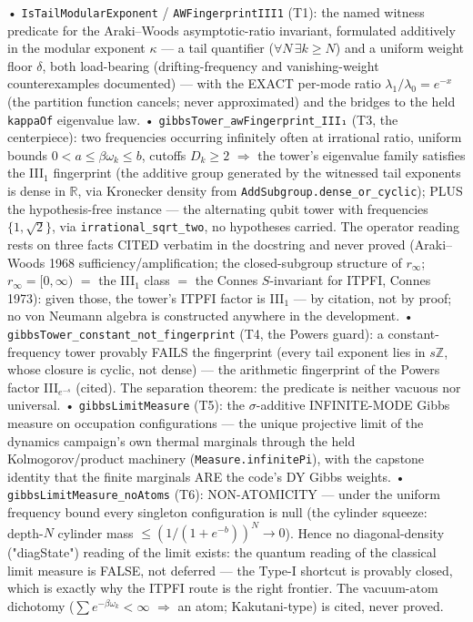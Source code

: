 \documentclass[11pt,a4paper]{article}
\begin{document}
  • \texttt{IsTailModularExponent} / \texttt{AWFingerprintIII1} (T1): the named witness predicate for the Araki--Woods asymptotic-ratio invariant, formulated additively in the modular exponent $\kappa$ --- a tail quantifier ($\forall N\,\exists k\ge N$) and a uniform weight floor $\delta$, both load-bearing (drifting-frequency and vanishing-weight counterexamples documented) --- with the EXACT per-mode ratio $\lambda_1/\lambda_0 = e^{-x}$ (the partition function cancels; never approximated) and the bridges to the held \texttt{kappaOf} eigenvalue law.
  • \texttt{gibbsTower\_awFingerprint\_III₁} (T3, the centerpiece): two frequencies occurring infinitely often at irrational ratio, uniform bounds $0<a\le\beta\omega_k\le b$, cutoffs $D_k\ge 2$ $\Rightarrow$ the tower's eigenvalue family satisfies the III$_1$ fingerprint (the additive group generated by the witnessed tail exponents is dense in $\mathbb R$, via Kronecker density from \texttt{AddSubgroup.dense\_or\_cyclic}); PLUS the hypothesis-free instance --- the alternating qubit tower with frequencies $\{1,\sqrt2\}$, via \texttt{irrational\_sqrt\_two}, no hypotheses carried. The operator reading rests on three facts CITED verbatim in the docstring and never proved (Araki--Woods 1968 sufficiency/amplification; the closed-subgroup structure of $r_\infty$; $r_\infty=[0,\infty)$ $=$ the III$_1$ class $=$ the Connes $S$-invariant for ITPFI, Connes 1973): given those, the tower's ITPFI factor is III$_1$ --- by citation, not by proof; no von Neumann algebra is constructed anywhere in the development.
  • \texttt{gibbsTower\_constant\_not\_fingerprint} (T4, the Powers guard): a constant-frequency tower provably FAILS the fingerprint (every tail exponent lies in $s\mathbb Z$, whose closure is cyclic, not dense) --- the arithmetic fingerprint of the Powers factor III$_{e^{-s}}$ (cited). The separation theorem: the predicate is neither vacuous nor universal.
  • \texttt{gibbsLimitMeasure} (T5): the $\sigma$-additive INFINITE-MODE Gibbs measure on occupation configurations --- the unique projective limit of the dynamics campaign's own thermal marginals through the held Kolmogorov/product machinery (\texttt{Measure.infinitePi}), with the capstone identity that the finite marginals ARE the code's DY Gibbs weights.
  • \texttt{gibbsLimitMeasure\_noAtoms} (T6): NON-ATOMICITY --- under the uniform frequency bound every singleton configuration is null (the cylinder squeeze: depth-$N$ cylinder mass $\le (1/(1+e^{-b}))^N \to 0$). Hence no diagonal-density ("diagState") reading of the limit exists: the quantum reading of the classical limit measure is FALSE, not deferred --- the Type-I shortcut is provably closed, which is exactly why the ITPFI route is the right frontier. The vacuum-atom dichotomy ($\sum e^{-\beta\omega_k}<\infty$ $\Rightarrow$ an atom; Kakutani-type) is cited, never proved.
\end{document}
